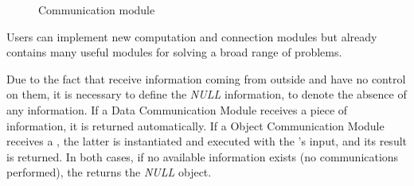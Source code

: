 \begin{figure}
	\centering
	\hspace{0.05\textwidth}%
	\caption[]{Communication module}
	\label{fig:och}
\end{figure}

Users can implement new computation and connection modules but \posl{} already contains many useful modules for solving a broad range of problems.

Due to the fact that \opchs{} receive information coming from outside and have no control on them, it is necessary to define the {\it NULL} information, to denote the absence of any information. If a Data Communication Module receives a piece of information, it is returned automatically. If a Object Communication Module receives a \om{}, the latter is instantiated and executed with the \opch's input, and its result is returned. In both cases, if no available information exists (no communications performed), the \opch{} returns the {\it NULL} object.